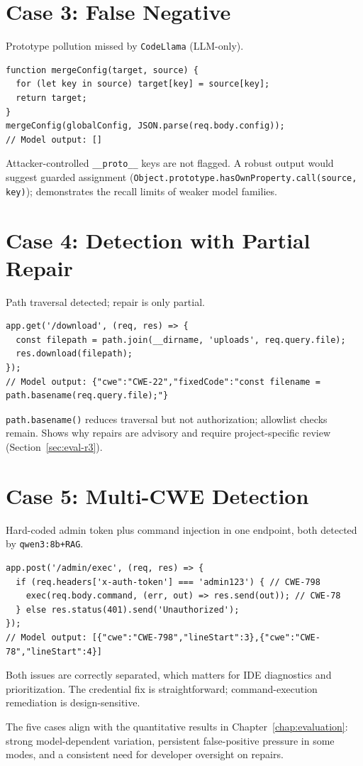 \section{Case 3: False Negative}
\label{sec:case-fn}
Prototype pollution missed by \texttt{CodeLlama} (LLM-only).
\begin{lstlisting}[caption={Prototype pollution (CWE-1321) returning empty findings}]
function mergeConfig(target, source) {
  for (let key in source) target[key] = source[key];
  return target;
}
mergeConfig(globalConfig, JSON.parse(req.body.config));
// Model output: []
\end{lstlisting}
Attacker-controlled \texttt{\_\_proto\_\_} keys are not flagged. A robust output would suggest guarded assignment (\texttt{Object.prototype.hasOwnProperty.call(source, key)}); demonstrates the recall limits of weaker model families.

\section{Case 4: Detection with Partial Repair}
\label{sec:case-repair-partial}
Path traversal detected; repair is only partial.
\begin{lstlisting}[caption={Path traversal (CWE-22) with under-specified repair}]
app.get('/download', (req, res) => {
  const filepath = path.join(__dirname, 'uploads', req.query.file);
  res.download(filepath);
});
// Model output: {"cwe":"CWE-22","fixedCode":"const filename = path.basename(req.query.file);"}
\end{lstlisting}
\texttt{path.basename()} reduces traversal but not authorization; allowlist checks remain. Shows why repairs are advisory and require project-specific review (Section~\ref{sec:eval-r3}).

\section{Case 5: Multi-CWE Detection}
\label{sec:case-multi-cwe}
Hard-coded admin token plus command injection in one endpoint, both detected by \texttt{qwen3:8b+RAG}.
\begin{lstlisting}[caption={Two findings from one handler (CWE-798 + CWE-78)}]
app.post('/admin/exec', (req, res) => {
  if (req.headers['x-auth-token'] === 'admin123') { // CWE-798
    exec(req.body.command, (err, out) => res.send(out)); // CWE-78
  } else res.status(401).send('Unauthorized');
});
// Model output: [{"cwe":"CWE-798","lineStart":3},{"cwe":"CWE-78","lineStart":4}]
\end{lstlisting}
Both issues are correctly separated, which matters for IDE diagnostics and prioritization. The credential fix is straightforward; command-execution remediation is design-sensitive.

\medskip

The five cases align with the quantitative results in Chapter~\ref{chap:evaluation}: strong model-dependent variation, persistent false-positive pressure in some modes, and a consistent need for developer oversight on repairs.

